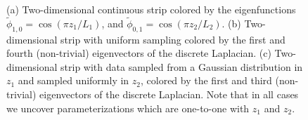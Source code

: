 \begin{figure}[t]
\begin{subfigure}{0.3\textwidth}
\caption{}
\label{subfig:strip_evecs_nonuniform}
\end{subfigure}
%
\caption[Eigenfunctions of the Laplace-Beltrami operator on a two-dimensional strip]{(a) Two-dimensional continuous strip colored by the eigenfunctions $\tilde{\phi}_{1, 0} = \cos \left( {\pi z_1}/{L_1} \right)$, and $\tilde{\phi}_{0, 1} = \cos \left( {\pi z_2}/{L_2} \right)$. (b) Two-dimensional strip with uniform sampling colored by the first and fourth (non-trivial) eigenvectors of the discrete Laplacian. (c) Two-dimensional strip with data sampled from a Gaussian distribution in $z_1$ and sampled uniformly in $z_2$, colored by the first and third (non-trivial) eigenvectors of the discrete Laplacian. Note that in all cases we uncover parameterizations which are one-to-one with $z_1$ and $z_2$.}
\end{figure}


